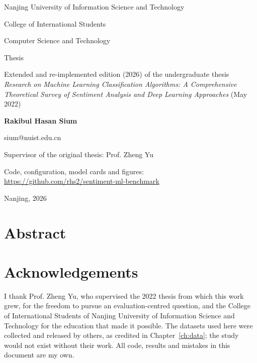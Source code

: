 \documentclass[11pt,a4paper,oneside]{report}
\begin{document}
\begin{titlepage}
\singlespacing
\centering
\vspace*{1cm}
{\large Nanjing University of Information Science and Technology\par}
{\large College of International Students\par}
{\normalsize Computer Science and Technology\par}
\vspace{2cm}
{\Huge\bfseries \ThesisTitle\par}
\vspace{1.2cm}
{\large Thesis\par}
\vspace{0.4cm}
{\normalsize Extended and re-implemented edition (2026) of the undergraduate thesis\\\emph{Research on Machine Learning Classification Algorithms: A Comprehensive Theoretical Survey of Sentiment Analysis and Deep Learning Approaches} (May 2022)\par}
\vspace{1.5cm}
{\large\bfseries Rakibul Hasan Sium\par}
{\normalsize sium@nuist.edu.cn\par}
\vspace{0.8cm}
{\normalsize Supervisor of the original thesis: Prof. Zheng Yu\par}
\vspace{1.5cm}
{\normalsize Code, configuration, model cards and figures:\\\url{https://github.com/rhs2/sentiment-ml-benchmark}\par}
\vfill
{\normalsize Nanjing, 2026\par}
\end{titlepage}

\chapter*{Abstract}


\chapter*{Acknowledgements}
I thank Prof. Zheng Yu, who supervised the 2022 thesis from which this work grew, for the freedom to pursue an evaluation-centred question, and the College of International Students of Nanjing University of Information Science and Technology for the education that made it possible. The datasets used here were collected and released by others, as credited in Chapter~\ref{ch:data}; the study would not exist without their work. All code, results and mistakes in this document are my own.
\end{document}
